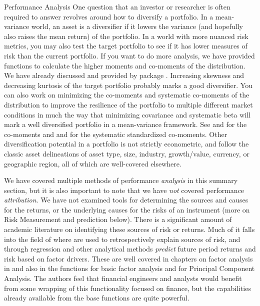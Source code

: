 \documentclass[12pt,letterpaper,english]{article}
\begin{document}
\begin{Section}{Performance Analysis}
One question that an investor or researcher is often required to answer revolves around how to diversify a portfolio.  In a mean-variance world, an asset is a diversifier if it lowers the variance (and hopefully also raises the mean return) of the portfolio.  In a world with more nuanced risk metrics, you may also test the target portfolio to see if it has lower measures of risk than the current portfolio. If you want to do more analysis, we have provided functions to calculate the higher moments and co-moments of the distribution.  We have already discussed  and  provided by package .  Increasing skewness and decreasing kurtosis of the target portfolio probably marks a good diversifier.  You can also work on minimizing the co-moments and systematic co-moments of the distribution to improve the resilience of the portfolio to multiple different market conditions in much the way that minimizing covariance and systematic beta will mark a well diversified portfolio in a mean-variance framework.  See  and  for the co-moments and  and  for the systematic standardized co-moments. Other diversification potential in a portfolio is not strictly econometric, and follow the classic asset delineations of asset type, size, industry, growth/value, currency, or geographic region, all of which are well-covered elsewhere.

We have covered multiple methods of performance \emph{analysis} in this summary section, but it is also important to note that we have \emph{not} covered performance \emph{attribution}.  We have not examined tools for determining the sources and causes for the returns, or the underlying causes for the risks of an instrument (more on Risk Measurement and prediction below).  There is a significant amount of academic literature on identifying these sources of risk or returns.  Much of it falls into the field of  where  are used to retrospectively explain sources of risk, and through regression and other analytical methods \emph{predict} future period returns and risk based on factor drivers.  These are well covered in chapters on factor analysis in \Cite{Zivot and Wang(2006)} and also in the \R{} functions  for basic factor analysis and  for Principal Component Analysis.  The authors feel that financial engineers and analysts would benefit from some wrapping of this functionality focused on finance, but the capabilities already available from the base functions are quite powerful.
\end{Section}
\end{document}
